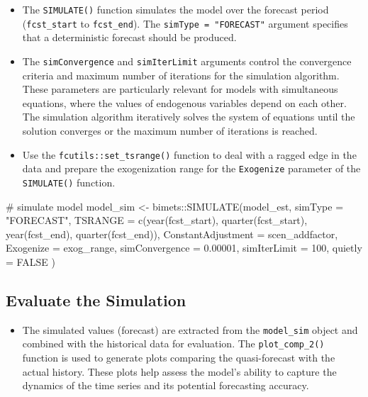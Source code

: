 \documentclass[
  letterpaper,
  DIV=11,
  numbers=noendperiod]{scrreport}
\newenvironment{Shaded}{\begin{snugshade}}{\end{snugshade}}
\newcommand{\AttributeTok}[1]{\textcolor[rgb]{0.40,0.45,0.13}{#1}}
\newcommand{\CommentTok}[1]{\textcolor[rgb]{0.37,0.37,0.37}{#1}}
\newcommand{\ConstantTok}[1]{\textcolor[rgb]{0.56,0.35,0.01}{#1}}
\newcommand{\DecValTok}[1]{\textcolor[rgb]{0.68,0.00,0.00}{#1}}
\newcommand{\FloatTok}[1]{\textcolor[rgb]{0.68,0.00,0.00}{#1}}
\newcommand{\FunctionTok}[1]{\textcolor[rgb]{0.28,0.35,0.67}{#1}}
\newcommand{\NormalTok}[1]{\textcolor[rgb]{0.00,0.23,0.31}{#1}}
\newcommand{\OtherTok}[1]{\textcolor[rgb]{0.00,0.23,0.31}{#1}}
\newcommand{\SpecialCharTok}[1]{\textcolor[rgb]{0.37,0.37,0.37}{#1}}
\newcommand{\StringTok}[1]{\textcolor[rgb]{0.13,0.47,0.30}{#1}}
\providecommand{\tightlist}{%
  \setlength{\itemsep}{0pt}\setlength{\parskip}{0pt}}\usepackage{longtable,booktabs,array}
\begin{document}
\begin{itemize}
\tightlist
\item
  The \texttt{SIMULATE()} function simulates the model over the forecast
  period (\texttt{fcst\_start} to \texttt{fcst\_end}). The
  \texttt{simType\ =\ "FORECAST"} argument specifies that a
  deterministic forecast should be produced.
\item
  The \texttt{simConvergence} and \texttt{simIterLimit} arguments
  control the convergence criteria and maximum number of iterations for
  the simulation algorithm. These parameters are particularly relevant
  for models with simultaneous equations, where the values of endogenous
  variables depend on each other. The simulation algorithm iteratively
  solves the system of equations until the solution converges or the
  maximum number of iterations is reached.
\item
  Use the \texttt{fcutils::set\_tsrange()} function to deal with a
  ragged edge in the data and prepare the exogenization range for the
  \texttt{Exogenize} parameter of the \texttt{SIMULATE()} function.
\end{itemize}

\begin{Shaded}
\begin{Highlighting}[]
\CommentTok{\# simulate model}
\NormalTok{model\_sim }\OtherTok{\textless{}{-}}\NormalTok{ bimets}\SpecialCharTok{::}\FunctionTok{SIMULATE}\NormalTok{(model\_est,}
  \AttributeTok{simType =} \StringTok{"FORECAST"}\NormalTok{,}
  \AttributeTok{TSRANGE =} \FunctionTok{c}\NormalTok{(}\FunctionTok{year}\NormalTok{(fcst\_start), }\FunctionTok{quarter}\NormalTok{(fcst\_start), }\FunctionTok{year}\NormalTok{(fcst\_end), }\FunctionTok{quarter}\NormalTok{(fcst\_end)),}
  \AttributeTok{ConstantAdjustment =}\NormalTok{ scen\_addfactor,}
  \AttributeTok{Exogenize =}\NormalTok{ exog\_range,}
  \AttributeTok{simConvergence =} \FloatTok{0.00001}\NormalTok{,}
  \AttributeTok{simIterLimit =} \DecValTok{100}\NormalTok{,}
  \AttributeTok{quietly =} \ConstantTok{FALSE}
\NormalTok{)}
\end{Highlighting}
\end{Shaded}

\subsection{Evaluate the Simulation}\label{evaluate-the-simulation}

\begin{itemize}
\tightlist
\item
  The simulated values (forecast) are extracted from the
  \texttt{model\_sim} object and combined with the historical data for
  evaluation. The \texttt{plot\_comp\_2()} function is used to generate
  plots comparing the quasi-forecast with the actual history. These
  plots help assess the model's ability to capture the dynamics of the
  time series and its potential forecasting accuracy.
\end{itemize}
\end{document}
